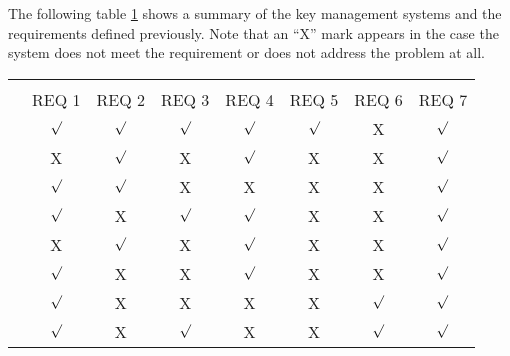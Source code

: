 The following table \ref{table:summaryREQ} shows a summary of the key management systems and the requirements defined previously. Note that an ``X'' mark appears in the case the system does not meet the requirement or does not address the problem at all.    


\begin{table}[hbt]
\label{table:summaryREQ}
\begin{tabular}{@{}lccccccc@{}}
 & \multicolumn{7}{l}{\cellcolor[HTML]{000000}{\color[HTML]{EFEFEF} key management requirement}} \\
                           & \multicolumn{1}{l}{\cellcolor[HTML]{C0C0C0}REQ 1} & \multicolumn{1}{l}{\cellcolor[HTML]{C0C0C0}REQ 2} & \multicolumn{1}{l}{\cellcolor[HTML]{C0C0C0}REQ 3} & \multicolumn{1}{l}{\cellcolor[HTML]{C0C0C0}REQ 4} & \multicolumn{1}{l}{\cellcolor[HTML]{C0C0C0}REQ 5} & \multicolumn{1}{l}{\cellcolor[HTML]{C0C0C0}REQ 6} & \multicolumn{1}{l}{\cellcolor[HTML]{C0C0C0}REQ 7} \\
\cellcolor[HTML]{C0C0C0}\cite{burleigh-dtnwg-dtka-01}   & $\surd$   & $\surd$   & $\surd$ & $\surd$ & $\surd$  & X & $\surd$  \\
\cellcolor[HTML]{C0C0C0}\cite{seth2005practical}  & X & $\surd$ & X  & $\surd$  & X & X & $\surd$ \\
\cellcolor[HTML]{C0C0C0}\cite{kate2007anonymity} & $\surd$ & $\surd$ & X  & X  & X & X & $\surd$ \\
\cellcolor[HTML]{C0C0C0}\cite{xie2013practical} & $\surd$ & X & $\surd$  & $\surd$  & X & X & $\surd$ \\
\cellcolor[HTML]{C0C0C0}\cite{van2010dynamic}  & X & $\surd$ & X  & $\surd$  & X & X & $\surd$ \\
\cellcolor[HTML]{C0C0C0}\cite{lv2014non} & $\surd$ & X & X  & $\surd$  & X & X & $\surd$ \\
\cellcolor[HTML]{C0C0C0} \cite{bhutta2014efficient} & $\surd$ & X & X  & X  & X & $\surd$ & $\surd$ \\
\cellcolor[HTML]{C0C0C0} \cite{de2016fully} & $\surd$ & X & $\surd$  & X  & X & $\surd$ & $\surd$ \\

\end{tabular}
\end{table}

